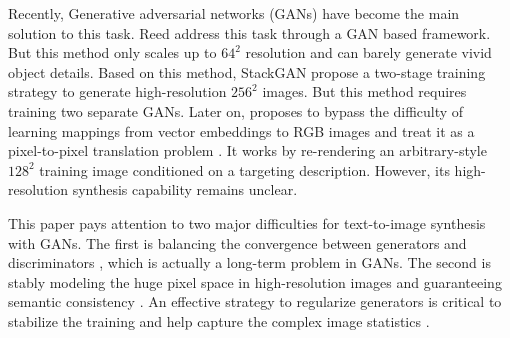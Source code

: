\documentclass[10pt,twocolumn,letterpaper]{article}
\begin{document}
Recently, Generative adversarial networks (GANs) have become the main solution to this task. 
Reed \etal \cite{reed2016generative} address this task through a GAN based framework. But this method only scales up to $64^2$ resolution and can barely generate vivid object details.
Based on this method, StackGAN  \cite{han2017stackgan} propose a two-stage training strategy to generate high-resolution $256^2$ images. But this method requires training two separate GANs.  Later on, \cite{dong2017semantic} proposes to bypass the difficulty of learning mappings from vector embeddings to RGB images and treat it as a pixel-to-pixel translation problem \cite{isola2016image}. It works by re-rendering an arbitrary-style $128^2$ training image conditioned on a targeting description. However, its high-resolution synthesis capability remains unclear. 

This paper pays attention to two major difficulties for text-to-image synthesis with GANs. The first is balancing the convergence between generators and discriminators \cite{goodfellow2014generative,improvedGAN}, which is actually a long-term problem in GANs. The second is stably modeling the huge pixel space in high-resolution images and guaranteeing semantic consistency \cite{han2017stackgan}. 
An effective strategy to regularize generators is critical to stabilize the training and help capture the complex image statistics \cite{huang2016stacked}. 
\end{document}
